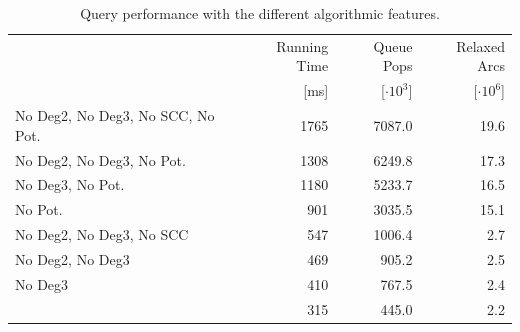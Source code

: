 \documentclass[a4paper,UKenglish,cleveref, autoref]{lipics-v2019}
\begin{document}
\begin{table}
\centering
\caption{Query performance with the different algorithmic features.}\label{tab:building_blocks}
\begin{tabular}{lrrr}
\toprule
{} & Running Time &     Queue Pops &   Relaxed Arcs \\
{} &         [ms] & [$\cdot 10^3$] & [$\cdot 10^6$] \\
\midrule
No Deg2, No Deg3, No SCC, No Pot. & 1765 & 7087.0 & 19.6 \\
No Deg2, No Deg3, No Pot.         & 1308 & 6249.8 & 17.3 \\
No Deg3, No Pot.                  & 1180 & 5233.7 & 16.5 \\
No Pot.                           &  901 & 3035.5 & 15.1 \\
No Deg2, No Deg3, No SCC          &  547 & 1006.4 &  2.7 \\
No Deg2, No Deg3                  &  469 &  905.2 &  2.5 \\
No Deg3                           &  410 &  767.5 &  2.4 \\
                                  &  315 &  445.0 &  2.2 \\
\bottomrule
\end{tabular}
\end{table}
\end{document}
